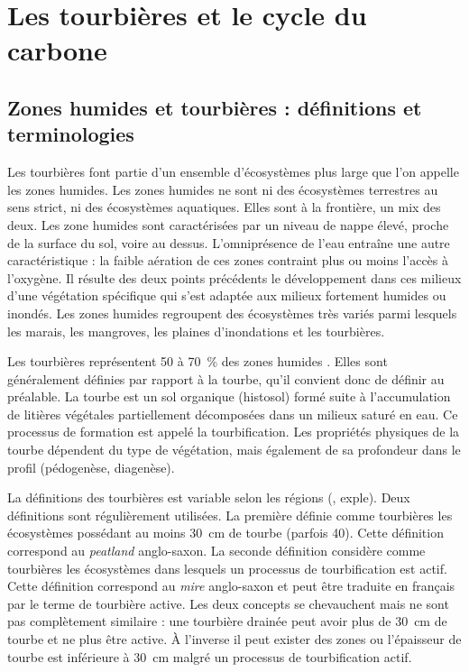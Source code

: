 \section{Les tourbières et le cycle du carbone}

\subsection{Zones humides et tourbières : définitions et terminologies}
Les tourbières font partie d'un ensemble d'écosystèmes plus large que l'on appelle les zones humides.
Les zones humides ne sont ni des écosystèmes terrestres au sens strict, ni des écosystèmes aquatiques.
Elles sont à la frontière, un mix des deux.
Les zone humides sont caractérisées par un niveau de nappe élevé, proche de la surface du sol, voire au dessus.
L'omniprésence de l'eau entraîne une autre caractéristique : la faible aération de ces zones contraint plus ou moins l'accès à l'oxygène.
Il résulte des deux points précédents le développement dans ces milieux d'une végétation spécifique qui s'est adaptée aux milieux fortement humides ou inondés.
Les zones humides regroupent des écosystèmes très variés parmi lesquels les marais, les mangroves, les plaines d'inondations et les tourbières.

Les tourbières représentent 50 à \SI{70}{\percent} des zones humides \cite{joosten2002}.
Elles sont généralement définies par rapport à la tourbe, qu'il convient donc de définir au préalable.
La tourbe est un sol organique (histosol) formé suite à l'accumulation de litières végétales partiellement décomposées dans un milieux saturé en eau.
Ce processus de formation est appelé la tourbification.
Les propriétés physiques de la tourbe dépendent du type de végétation, mais également de sa profondeur dans le profil (pédogenèse, diagenèse).

La définitions des tourbières est variable selon les régions (\plop, exple).
Deux définitions sont régulièrement utilisées.
La première définie comme tourbières les écosystèmes possédant au moins \SI{30}{\cm} de tourbe (parfois 40).
Cette définition correspond au \textit{peatland} anglo-saxon.
La seconde définition considère comme tourbières les écosystèmes dans lesquels un processus de tourbification est actif.
Cette définition correspond au \textit{mire} anglo-saxon et peut être traduite en français par le terme de tourbière active.
Les deux concepts se chevauchent mais ne sont pas complètement similaire : une tourbière drainée peut avoir plus de \SI{30}{cm} de tourbe et ne plus être active.
À l'inverse il peut exister des zones ou l'épaisseur de tourbe est inférieure à \SI{30}{cm} malgré un processus de tourbification actif.

